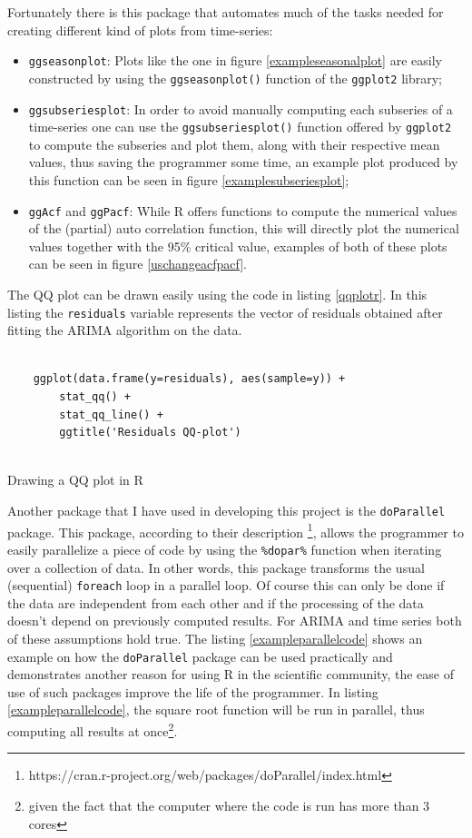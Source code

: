 \documentclass[12pt,a4paper,titlepage]{report}
\begin{document}
Fortunately there is this package that automates much of the tasks needed for creating different kind of plots from time-series:

\begin{itemize}
    \item \texttt{ggseasonplot}: Plots like the one in figure \ref{exampleseasonalplot} are easily constructed by using the \texttt{ggseasonplot()} function of the \texttt{ggplot2} library;
    \item \texttt{ggsubseriesplot}: In order to avoid manually computing each subseries of a time-series one can use the \texttt{ggsubseriesplot()} function offered by \texttt{ggplot2} to compute the subseries and plot them, along with their respective mean values, thus saving the programmer some time, an example plot produced by this function can be seen in figure \ref{examplesubseriesplot};
    \item \texttt{ggAcf} and \texttt{ggPacf}: While R offers functions to compute the numerical values of the (partial) auto correlation function, this will directly plot the numerical values together with the 95\% critical value, examples of both of these plots can be seen in figure \ref{uschangeacfpacf}.
\end{itemize}

The QQ plot can be drawn easily using the code in listing \ref{qqplotr}. In this listing the \texttt{residuals} variable represents the vector of residuals obtained after fitting the ARIMA algorithm on the data.

\begin{listing}[h]
    \begin{verbatim}
    
    ggplot(data.frame(y=residuals), aes(sample=y)) +
        stat_qq() +
        stat_qq_line() +
        ggtitle('Residuals QQ-plot')
    
    \end{verbatim}
    
    \caption{Drawing a QQ plot in R}
    \label{qqplotr}
\end{listing}

Another package that I have used in developing this project is the \texttt{doParallel} package. This package, according to their description \footnote{https://cran.r-project.org/web/packages/doParallel/index.html}, allows the programmer to easily parallelize a piece of code by using the \texttt{\%dopar\%} function when iterating over a collection of data. In other words, this package transforms the usual (sequential) \texttt{foreach} loop in a parallel loop. Of course this can only be done if the data are independent from each other and if the processing of the data doesn't depend on previously computed results. For ARIMA and time series both of these assumptions hold true. The listing \ref{exampleparallelcode} shows an example on how the \texttt{doParallel} package can be used practically and demonstrates another reason for using R in the scientific community, the ease of use of such packages improve the life of the programmer. In listing \ref{exampleparallelcode}, the square root function will be run in parallel, thus computing all results at once\footnote{given the fact that the computer where the code is run has more than 3 cores}.
\end{document}
